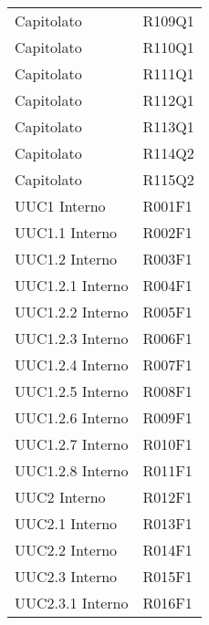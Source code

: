 \documentclass[../analisi-dei-requisiti.tex]{subfiles}
\begin{document}
\begin{longtable}[H]{ p{4cm} | p{4cm} }
  Capitolato                    & R109Q1                               \\
  Capitolato                    & R110Q1                               \\
  Capitolato                    & R111Q1                               \\
  Capitolato                    & R112Q1                               \\
  Capitolato                    & R113Q1                               \\
  Capitolato                    & R114Q2                               \\
  Capitolato                    & R115Q2                               \\
  UUC1 Interno                  & R001F1                               \\
  UUC1.1 Interno                & R002F1                               \\
  UUC1.2 Interno                & R003F1                               \\
  UUC1.2.1 Interno              & R004F1                               \\
  UUC1.2.2 Interno              & R005F1                               \\
  UUC1.2.3 Interno              & R006F1                               \\
  UUC1.2.4 Interno              & R007F1                               \\
  UUC1.2.5 Interno              & R008F1                               \\
  UUC1.2.6 Interno              & R009F1                               \\
  UUC1.2.7 Interno              & R010F1                               \\
  UUC1.2.8 Interno              & R011F1                               \\
  UUC2 Interno                  & R012F1                               \\
  UUC2.1 Interno                & R013F1                               \\
  UUC2.2 Interno                & R014F1                               \\
  UUC2.3 Interno                & R015F1                               \\
  UUC2.3.1 Interno              & R016F1                               \\

\end{longtable}
\end{document}
